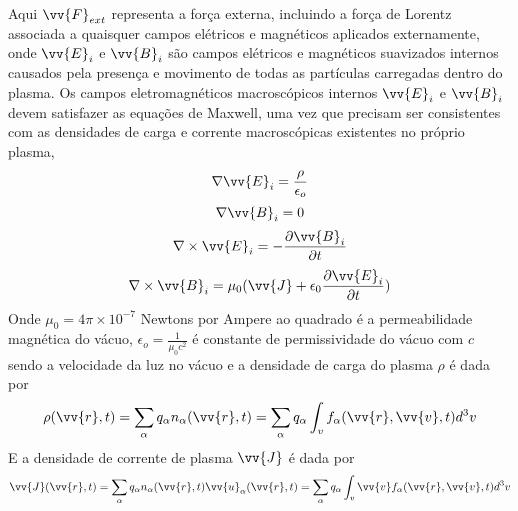\documentclass[12pt,oneside,a4paper]{abntex2}
\theoremstyle{definition}  %
\begin{document}
Aqui $\vv{F}_{ext}$ representa a força externa, incluindo a força de Lorentz associada a quaisquer campos elétricos e magnéticos aplicados externamente, onde $\vv{E}_i$ e $\vv{B}_i$ são campos elétricos e magnéticos suavizados internos causados pela presença e movimento de todas as partículas carregadas dentro do plasma. Os campos eletromagnéticos macroscópicos internos $\vv{E}_i$ e $\vv{B}_i$  devem satisfazer as equações de Maxwell, uma vez que precisam ser consistentes com as densidades de carga e corrente macroscópicas existentes no próprio plasma,
\begin{equation}
\label{eq: max1}
\nabla \vv{E}_i = \frac{\rho}{\epsilon_o}
\end{equation}
\begin{equation}
\label{eq: max2}
\nabla \vv{B}_i = 0
\end{equation}
\begin{equation}
\label{eq: max3}
\nabla \times \vv{E}_i = -\frac{\partial \vv{B}_i}{\partial t}
\end{equation}
\begin{equation}
\label{eq: max4}
\nabla \times \vv{B}_i = \mu_0 (\vv{J} + \epsilon_0 \frac{\partial \vv{E}_i}{\partial t} )
\end{equation}
Onde $\mu_0 = 4\pi \times 10^{-7}$ Newtons por Ampere ao quadrado  é a permeabilidade magnética do vácuo, $\epsilon_o = \frac{1}{\mu_0 c^2}$ é constante de permissividade do vácuo com $c$ sendo a velocidade da luz no vácuo e a densidade de carga do plasma $\rho$ é dada por
\begin{equation}
\label{eq: rho}
\rho(\vv{r},t) = \sum_\alpha q_\alpha n_\alpha(\vv{r},t) = \sum_\alpha q_\alpha \int_v f_\alpha(\vv{r},\vv{v},t) d^3v
\end{equation}
E a densidade de corrente de plasma $\vv{J}$ é dada por
\begin{equation}
\label{eq: densidadecorrente}
\vv{J}(\vv{r},t) = \sum_\alpha q_\alpha n_\alpha(\vv{r},t) \vv{u}_\alpha(\vv{r},t) = \sum_\alpha  q_\alpha \int_v \vv{v} f_\alpha(\vv{r},\vv{v},t) d^3v
\end{equation}
\end{document}
